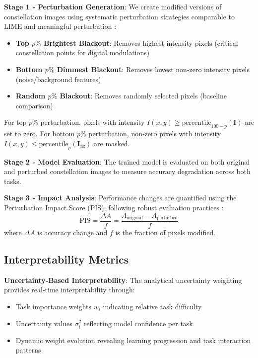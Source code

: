 \documentclass{ELSP}
\begin{document}
\textbf{Stage 1 ‑ Perturbation Generation}: We create modified versions of constellation images using systematic perturbation strategies comparable to LIME \cite{10.1145/2939672.2939778} and meaningful perturbation \cite{fong2017interpretable}:
\begin{itemize}
\item \textbf{Top $p\%$ Brightest Blackout}: Removes highest intensity pixels (critical constellation points for digital modulations)
\item \textbf{Bottom $p\%$ Dimmest Blackout}: Removes lowest non‑zero intensity pixels (noise/background features)  
\item \textbf{Random $p\%$ Blackout}: Removes randomly selected pixels (baseline comparison)
\end{itemize}

For top $p\%$ perturbation, pixels with intensity $I(x,y) \geq \text{percentile}_{100-p}(\mathbf{I})$ are set to zero. For bottom $p\%$ perturbation, non‑zero pixels with intensity $I(x,y) \leq \text{percentile}_p(\mathbf{I}_{\text{nz}})$ are masked.

\textbf{Stage 2 ‑ Model Evaluation}: The trained model is evaluated on both original and perturbed constellation images to measure accuracy degradation across both tasks.

\textbf{Stage 3 ‑ Impact Analysis}: Performance changes are quantified using the Perturbation Impact Score (PIS), following robust evaluation practices \cite{fel2023don}:
\begin{equation}
\text{PIS} = \frac{\Delta A}{f} = \frac{A_{\text{original}} - A_{\text{perturbed}}}{f}
\end{equation}
where $\Delta A$ is accuracy change and $f$ is the fraction of pixels modified.

\subsection{Interpretability Metrics}

\textbf{Uncertainty‑Based Interpretability}: The analytical uncertainty weighting provides real‑time interpretability through:
\begin{itemize}
\item Task importance weights $w_i$ indicating relative task difficulty
\item Uncertainty values $\sigma_i^2$ reflecting model confidence per task
\item Dynamic weight evolution revealing learning progression and task interaction patterns
\end{itemize}
\end{document}
